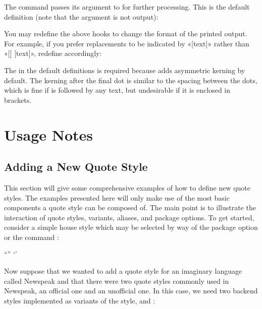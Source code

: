 \documentclass{ltxdockit}[2010/09/26]
\begin{document}
\begin{ltxcode}[showspaces=true]
\newcommand{<<\mktextins>>}[1]{[#1]}
\newcommand{<<\mktextmod>>}[1]{[#1]}
\end{ltxcode}
%
The  command passes its  argument to  for further processing. This is the default definition (note that the argument is not output):

\begin{ltxcode}[showspaces=true]
\newcommand{<<\mktextdel>>}[1]{[]}
\end{ltxcode}
%
You may redefine the above hooks to change the format of the printed output. For example, if you prefer replacements to be indicated by «[\textellipsis text]» rather than «[\textellipsis\unkern] [text]», redefine  accordingly:

\begin{ltxcode}
\newcommand{<<\mktextelpins>>}[1]{[\textellipsis #1]}
\end{ltxcode}
%
The  in the default definitions is required because  adds asymmetric kerning by default. The kerning after the final dot is similar to the spacing between the dots, which is fine if  is followed by any text, but undesirable if it is enclosed in brackets.

\section{Usage Notes}
\label{use}

\subsection{Adding a New Quote Style}
\label{use:spl}

This section will give some comprehensive examples of how to define new quote styles. The examples presented here will only make use of the most basic components a quote style can be composed of. The main point is to illustrate the interaction of quote styles, variants, aliases, and package options. To get started, consider a simple house style which may be selected by way of the package option  or the command :

\begin{ltxcode}
  {\textquotedblleft}{\textquotedblright}
  {\textquoteleft}{\textquoteright}
\end{ltxcode}
%
Now suppose that we wanted to add a quote style for an imaginary language called Newspeak and that there were two quote styles commonly used in Newspeak, an official one and an unofficial one. In this case, we need two backend styles implemented as variants of the  style,  and :
\end{document}
